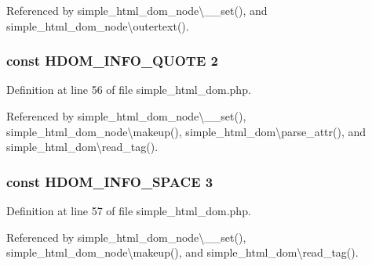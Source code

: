 Referenced by simple\+\_\+html\+\_\+dom\+\_\+node\textbackslash{}\+\_\+\+\_\+set(), and simple\+\_\+html\+\_\+dom\+\_\+node\textbackslash{}outertext().

\hypertarget{simple__html__dom_8php_a5279528b3cf095b0488b0b005607f909}{}
\subsubsection[{H\+D\+O\+M\+\_\+\+I\+N\+F\+O\+\_\+\+Q\+U\+O\+T\+E}]{\setlength{\rightskip}{0pt plus 5cm}const H\+D\+O\+M\+\_\+\+I\+N\+F\+O\+\_\+\+Q\+U\+O\+T\+E 2}\label{simple__html__dom_8php_a5279528b3cf095b0488b0b005607f909}


Definition at line 56 of file simple\+\_\+html\+\_\+dom.\+php.



Referenced by simple\+\_\+html\+\_\+dom\+\_\+node\textbackslash{}\+\_\+\+\_\+set(), simple\+\_\+html\+\_\+dom\+\_\+node\textbackslash{}makeup(), simple\+\_\+html\+\_\+dom\textbackslash{}parse\+\_\+attr(), and simple\+\_\+html\+\_\+dom\textbackslash{}read\+\_\+tag().

\hypertarget{simple__html__dom_8php_a6ad37ea016cdee2f705b1e475ed7a285}{}
\subsubsection[{H\+D\+O\+M\+\_\+\+I\+N\+F\+O\+\_\+\+S\+P\+A\+C\+E}]{\setlength{\rightskip}{0pt plus 5cm}const H\+D\+O\+M\+\_\+\+I\+N\+F\+O\+\_\+\+S\+P\+A\+C\+E 3}\label{simple__html__dom_8php_a6ad37ea016cdee2f705b1e475ed7a285}


Definition at line 57 of file simple\+\_\+html\+\_\+dom.\+php.



Referenced by simple\+\_\+html\+\_\+dom\+\_\+node\textbackslash{}\+\_\+\+\_\+set(), simple\+\_\+html\+\_\+dom\+\_\+node\textbackslash{}makeup(), and simple\+\_\+html\+\_\+dom\textbackslash{}read\+\_\+tag().

